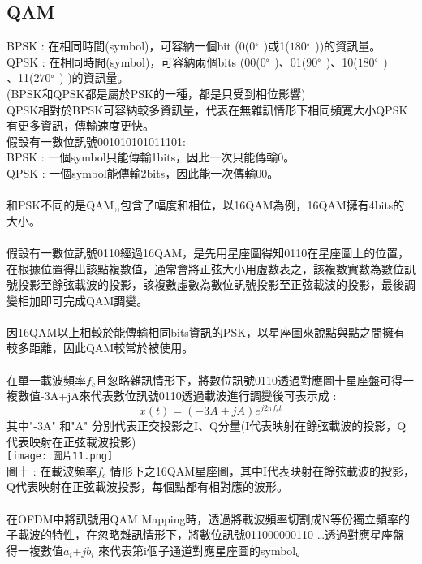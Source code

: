 \documentclass[12pt,a4paper]{article} %
\begin{document}
\subsection{QAM}
BPSK \cite{HD10_正交振幅調變00583}: 在相同時間(symbol)，可容納一個bit (0($0^{。}$)或1($180^{。}$))的資訊量。\\
QPSK \cite{HD10_正交振幅調變00583} : 在相同時間(symbol)，可容納兩個bits (00($0^{。}$)、01($90^{。}$)、10($180^{。}$)\\、11($270^{。}$) )的資訊量。\\
(BPSK和QPSK都是屬於PSK的一種，都是只受到相位影響)\\
QPSK相對於BPSK可容納較多資訊量，代表在無雜訊情形下相同頻寬大小QPSK有更多資訊，傳輸速度更快。\\
假設有一數位訊號001010101011101:\\
BPSK : 一個symbol只能傳輸1bits，因此一次只能傳輸0。\\
QPSK : 一個symbol能傳輸2bits，因此能一次傳輸00。\\
\\
和PSK不同的是QAM\cite{HD10_正交振幅調變00583},\cite{InsideWirelessQAM1},\cite{InsideWirelessQAM2}包含了幅度和相位，以16QAM為例，16QAM擁有4bits的大小。\\
\\
假設有一數位訊號0110經過16QAM，是先用星座圖得知0110在星座圖上的位置，在根據位置得出該點複數值，通常會將正弦大小用虛數表之，該複數實數為數位訊號投影至餘弦載波的投影，該複數虛數為數位訊號投影至正弦載波的投影，最後調變相加即可完成QAM調變。\\
\\
因16QAM以上相較於能傳輸相同bits資訊的PSK，以星座圖來說點與點之間擁有較多距離，因此QAM較常於被使用。\\
\\
在單一載波頻率$f_c$且忽略雜訊情形下，將數位訊號0110透過對應圖十星座盤可得一複數值-3A+jA來代表數位訊號0110透過載波進行調變後可表示成  :
\[x(t) = (-3A + jA) e^{j2\pi f_c t}\]
其中"-3A" 和"A" 分別代表正交投影之I、Q分量(I代表映射在餘弦載波的投影，Q代表映射在正弦載波投影)\\
\texttt{[image: 圖片11.png]}\\
圖十 : 在載波頻率$f_c$ 情形下之16QAM星座圖，其中I代表映射在餘弦載波的投影，Q代表映射在正弦載波投影，每個點都有相對應的波形\cite{WhatIsQAM?}。\\
\\
在OFDM中將訊號用QAM Mapping時，透過將載波頻率切割成N等份獨立頻率的子載波的特性，在忽略雜訊情形下，將數位訊號011000000110 …透過對應星座盤得一複數值$a_i$+$jb_i$ 來代表第i個子通道對應星座圖的symbol。
\end{document}
